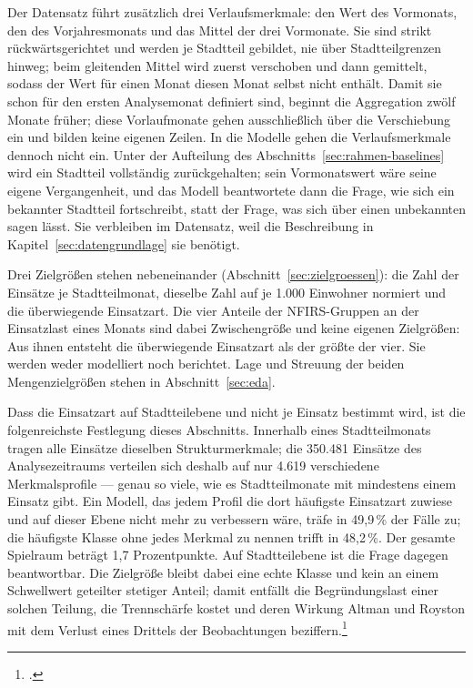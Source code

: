 Der Datensatz führt zusätzlich drei Verlaufsmerkmale: den Wert des Vormonats,
den des Vorjahresmonats und das Mittel der drei Vormonate. Sie sind strikt
rückwärtsgerichtet und werden je Stadtteil gebildet, nie über Stadtteilgrenzen
hinweg; beim gleitenden Mittel wird zuerst verschoben und dann gemittelt, sodass
der Wert für einen Monat diesen Monat selbst nicht enthält. Damit sie schon für
den ersten Analysemonat definiert sind, beginnt die Aggregation zwölf Monate
früher; diese Vorlaufmonate gehen ausschließlich über die Verschiebung ein und
bilden keine eigenen Zeilen. In die Modelle gehen die Verlaufsmerkmale dennoch
nicht ein. Unter der Aufteilung des Abschnitts~\ref{sec:rahmen-baselines} wird
ein Stadtteil vollständig zurückgehalten; sein Vormonatswert wäre seine eigene
Vergangenheit, und das Modell beantwortete dann die Frage, wie sich ein
bekannter Stadtteil fortschreibt, statt der Frage, was sich über einen
unbekannten sagen lässt. Sie verbleiben im Datensatz, weil die Beschreibung in
Kapitel~\ref{sec:datengrundlage} sie benötigt.

Drei Zielgrößen stehen nebeneinander (Abschnitt~\ref{sec:zielgroessen}): die
Zahl der Einsätze je Stadtteilmonat, dieselbe Zahl auf je 1.000 Einwohner
normiert und die überwiegende Einsatzart. Die vier Anteile der NFIRS-Gruppen an
der Einsatzlast eines Monats sind dabei Zwischengröße und keine eigenen
Zielgrößen: Aus ihnen entsteht die überwiegende Einsatzart als der größte der
vier. Sie werden weder modelliert noch berichtet. Lage und Streuung der beiden
Mengenzielgrößen stehen in Abschnitt~\ref{sec:eda}.

Dass die Einsatzart auf Stadtteilebene und nicht je Einsatz bestimmt wird, ist
die folgenreichste Festlegung dieses Abschnitts. Innerhalb eines Stadtteilmonats
tragen alle Einsätze dieselben Strukturmerkmale; die 350.481 Einsätze des
Analysezeitraums verteilen sich deshalb auf nur 4.619 verschiedene
Merkmalsprofile --- genau so viele, wie es Stadtteilmonate mit mindestens einem
Einsatz gibt. Ein Modell, das jedem Profil die dort häufigste Einsatzart zuwiese
und auf dieser Ebene nicht mehr zu verbessern wäre, träfe in 49,9\,\% der Fälle
zu; die häufigste Klasse ohne jedes Merkmal zu nennen trifft in 48,2\,\%. Der
gesamte Spielraum beträgt 1,7 Prozentpunkte. Auf Stadtteilebene ist die Frage
dagegen beantwortbar. Die Zielgröße bleibt dabei eine echte Klasse und kein an
einem Schwellwert geteilter stetiger Anteil; damit entfällt die
Begründungslast einer solchen Teilung, die Trennschärfe kostet und deren Wirkung
Altman und Royston mit dem Verlust eines Drittels der Beobachtungen
beziffern.\footcite{Altman2006}

